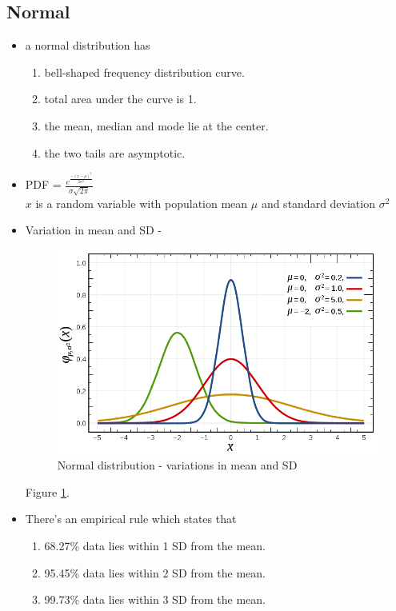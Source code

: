 \documentclass{article}
\begin{document}
\subsection{Normal}
\begin{itemize}
	\item a normal distribution has 
	\begin{enumerate}
		\item bell-shaped frequency distribution curve.
		\item total area under the curve is 1.
		\item the mean, median and mode lie at the center.
		\item the two tails are asymptotic.
	\end{enumerate}
	
	\item PDF = \mbox{\Large\(\frac{e^{\frac{-(x-\mu)^2}{2\sigma^2}}}{\sigma\sqrt{2\pi}}\)}\\
	$x$ is a random variable with population mean $\mu$ and standard deviation $\sigma^2$
	
	\item Variation in mean and SD -
	\begin{figure}
  		\includegraphics[width=\linewidth]{images/normal.png}
  		\caption{Normal distribution - variations in mean and SD}
  		\label{fig:normal dist.}
	\end{figure}

	Figure \ref{fig:normal dist.}.
	
	\item There's an empirical rule which states that 
	\begin{enumerate}
		\item 68.27\% data lies within 1 SD from the mean.
		\item 95.45\% data lies within 2 SD from the mean.
		\item 99.73\% data lies within 3 SD from the mean.				
	\end{enumerate}


\end{itemize}
\end{document}
